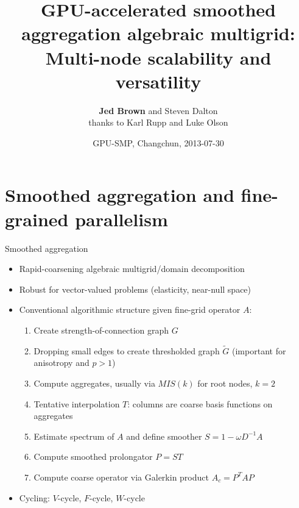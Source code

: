 \documentclass{beamer}
\title{GPU-accelerated smoothed aggregation algebraic multigrid: Multi-node scalability and versatility}
\author{{\bf Jed Brown}\inst{1} and Steven Dalton\inst{2} \\
  {\small thanks to Karl Rupp\inst{1} and Luke Olson\inst{2}}}
\institute
{
  \inst{1}{Mathematics and Computer Science Division, Argonne National Laboratory} \\
  \inst{2}{Department of Computer Science, University of Illinois at Urbana-Champaign}
}
\date{GPU-SMP, Changchun, 2013-07-30}
\newcommand{\mglevel}{\ensuremath{\ell}}
\begin{document}
\lstset{language=C}
\normalem

\begin{frame}
  \titlepage
\end{frame}

\section{Smoothed aggregation and fine-grained parallelism}
\begin{frame}[fragile]{Smoothed aggregation}
  \begin{itemize}
  \item Rapid-coarsening algebraic multigrid/domain decomposition
  \item Robust for vector-valued problems (elasticity, near-null space)
  \item Conventional algorithmic structure given fine-grid operator $A$:
    \begin{enumerate}
    \item Create strength-of-connection graph $G$
    \item Dropping small edges to create thresholded graph $\tilde G$ (important for anisotropy and $p>1$)
    \item Compute aggregates, usually via $MIS(k)$ for root nodes, $k=2$
    \item Tentative interpolation $T$: columns are coarse basis functions on aggregates
    \item Estimate spectrum of $A$ and define smoother $S = 1 - \omega D^{-1} A$
    \item \alert<2>{Compute smoothed prolongator $P = S T$}
    \item \alert<2>{Compute coarse operator via Galerkin product $A_c = P^T A P$}
    \end{enumerate}
  \item Cycling: $V$-cycle, $F$-cycle, $W$-cycle
    \begin{figure}
      \centering
\end{figure}
\end{itemize}
\end{frame}
\end{document}
